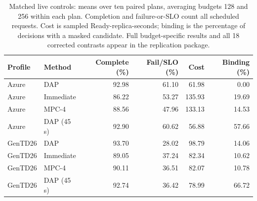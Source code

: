 \begin{table}[t]
\caption{Matched live controls: means over ten paired plans, averaging budgets 128 and 256 within each plan. Completion and failure-or-SLO count all scheduled requests. Cost is sampled Ready-replica-seconds; binding is the percentage of decisions with a masked candidate. Full budget-specific results and all 18 corrected contrasts appear in the replication package.}
\label{tab:revision-live}
\small
\begin{tabular}{llrrrr}
\toprule
Profile & Method & Complete (\%) & Fail/SLO (\%) & Cost & Binding (\%)\\
\midrule
Azure & DAP & 92.98 & 61.10 & 61.98 & 0.00\\
Azure & Immediate & 86.22 & 53.27 & 135.93 & 19.69\\
Azure & MPC-4 & 88.56 & 47.96 & 133.13 & 14.53\\
Azure & DAP (45 s) & 92.90 & 60.62 & 56.88 & 57.66\\
\midrule
GenTD26 & DAP & 93.70 & 28.02 & 98.79 & 14.06\\
GenTD26 & Immediate & 89.05 & 37.24 & 82.34 & 10.62\\
GenTD26 & MPC-4 & 90.11 & 36.51 & 82.07 & 10.78\\
GenTD26 & DAP (45 s) & 92.74 & 36.42 & 78.99 & 66.72\\
\bottomrule
\end{tabular}
\end{table}
